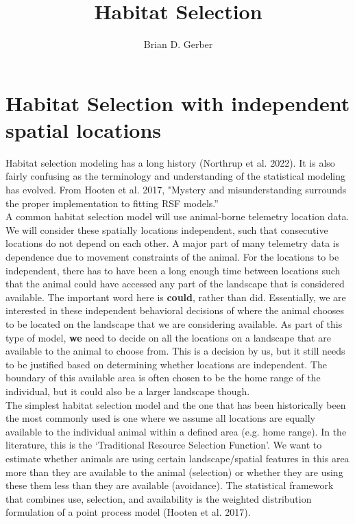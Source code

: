 \documentclass[12pt]{article}
\title{Habitat Selection}
\author{Brian D. Gerber}
\begin{document}
\maketitle
\section{Habitat Selection with independent spatial locations}

Habitat selection modeling has a long history (Northrup et al. 2022). It is also fairly confusing as the terminology and understanding of the statistical modeling has evolved. From Hooten et al. 2017, "Mystery and misunderstanding surrounds the proper implementation to fitting RSF models.”\\

A common habitat selection model will use animal-borne telemetry location data. We will consider these spatially locations independent, such that consecutive locations do not depend on each other. A major part of many telemetry data is dependence due to movement constraints of the animal. For the locations to be independent, there has to have been a long enough time between locations such  that the animal could have accessed any part of the landscape that is considered available. The important word here is \textbf{could}, rather than did. Essentially, we are interested in these independent behavioral decisions of where the animal chooses to be located on the landscape that we are considering available. As part of this type of model, \textbf{we} need to decide on all the locations on a landscape that are available to the animal to choose from. This is a decision by us, but it still needs to be justified based on determining whether locations are independent. The boundary of this available area is often chosen to be the home range of the individual, but it could also be a larger landscape though. \\
The simplest habitat selection model and the one that has been historically been the most commonly used is one where we assume all locations are equally available to the individual animal within a defined area (e.g. home range). In the literature, this is the `Traditional Resource Selection Function'. We want to estimate whether animals are using certain landscape/spatial features in this area more than they are available to the animal (selection) or whether they are using these them less than they are available (avoidance). The statistical framework that combines use, selection, and availability is the weighted distribution formulation of a point process model (Hooten et al. 2017).\\
\end{document}
